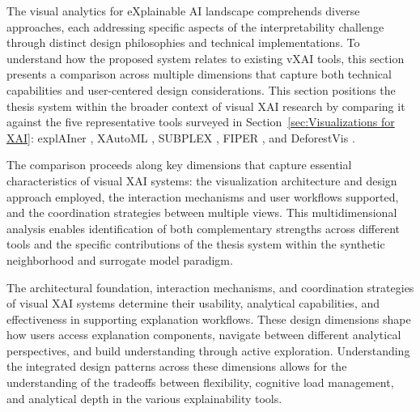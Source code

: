 


The visual analytics for eXplainable AI landscape 
comprehends diverse approaches, each addressing specific aspects of the interpretability challenge through distinct design philosophies and technical implementations. 
To understand how the proposed system relates to existing vXAI tools, this section presents a comparison across multiple dimensions that capture both technical capabilities and user-centered design considerations. 
This section positions the thesis system within the broader context of visual XAI research by comparing it against the five representative tools surveyed in Section~\ref{sec:Visualizations for XAI}: explAIner \cite{8807299}, XAutoML \cite{Z_ller_2023}, SUBPLEX \cite{9861728}, FIPER \cite{cappuccio2024fipervisualbasedexplanationcombining}, and DeforestVis \cite{Chatzimparmpas2023DeforestVisBA}.

The comparison proceeds along key dimensions that capture essential characteristics of visual XAI systems: the visualization architecture and design approach employed, the interaction mechanisms and user workflows supported, and the coordination strategies between multiple views. This multidimensional analysis enables identification of both complementary strengths across different tools and the specific contributions of the thesis system within the synthetic neighborhood and surrogate model paradigm.

The architectural foundation, interaction mechanisms, and coordination strategies of visual XAI systems determine their usability, analytical capabilities, and effectiveness in supporting explanation workflows. These design dimensions shape how users access explanation components, navigate between different analytical perspectives, and build understanding through active exploration. Understanding the integrated design patterns across these dimensions allows for the understanding of the tradeoffs between flexibility, cognitive load management, and analytical depth in the various explainability tools.


